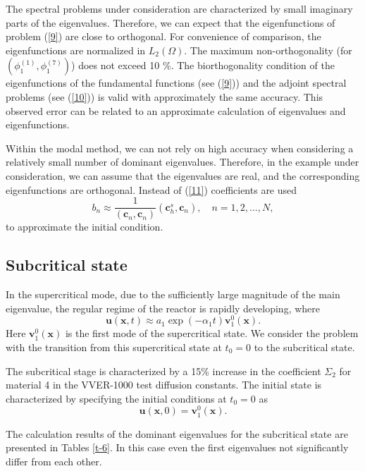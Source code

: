\documentclass[a4paper]{jpconf}
\begin{document}
The spectral problems under consideration are characterized by small imaginary parts of the eigenvalues. Therefore, we can expect that the eigenfunctions of problem (\ref{9}) 
are close to orthogonal. 
For convenience of comparison, the eigenfunctions are normalized in $L_2(\Omega)$.
The maximum non-orthogonality (for $(\phi_1^{(1)}, \phi_1^{(7)})$)
does not exceed 10 \%.
The biorthogonality condition of the eigenfunctions of the fundamental functions (see (\ref{9})) and the adjoint spectral problems (see (\ref{10})) is valid with approximately the same accuracy.
This observed error can be related to an approximate calculation of eigenvalues and eigenfunctions.

Within the modal method, we can not rely on high accuracy when considering a relatively small number of dominant eigenvalues. Therefore, in the example under consideration, we can assume that the eigenvalues are real, and the corresponding eigenfunctions are orthogonal. Instead of (\ref{11}) coefficients are used 
\begin{equation}\label{13}
 b_n \approx  \frac{1}{(\bm c_n, \bm c_n)} (\bm c_h^s, \bm c_n),
 \quad n = 1,2, ..., N ,
\end{equation}
to approximate the initial condition.

\subsection{Subcritical state} 

In the supercritical mode, due to the sufficiently large magnitude of the main eigenvalue, the regular regime of the reactor is rapidly developing, where 
\[
 \bm u (\bm x, t) \approx a_1 \exp(-\alpha_1 t) \bm v_1^0 (\bm x) .
\] 
Here  $\bm v_1^0 (\bm x)$ is the first mode of the supercritical state. We consider the problem with the transition from this supercritical state at  $t_0 = 0$  to the subcritical state.

The subcritical stage is characterized by a 15\% increase in the coefficient  
$\Sigma_2$ for material 4 in the VVER-1000 test diffusion constants. %
The initial state is characterized by specifying the initial conditions at $t_0 = 0$ as
\begin{equation}\label{14}
 \bm u (\bm x, 0) = \bm v_1^0 (\bm x) . 
\end{equation} 

The calculation results of  the dominant eigenvalues for the subcritical state are presented in Tables \ref{t-6}. In this case even the first eigenvalues not significantly differ from each other. 
\end{document}
